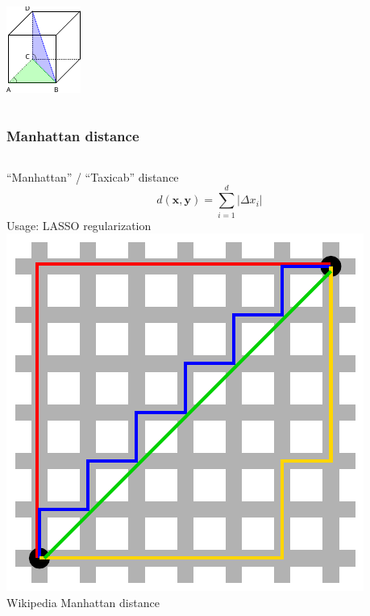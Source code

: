\documentclass[Nike]{tuberlinbeamer}
\newcommand{\x}{\boldsymbol{x}}
\newcommand{\y}{\boldsymbol{y}}
\begin{document}
\begin{frame}[t]
\begin{columns}[T]
      \vskip 2mm
      \includegraphics[width=.7\textwidth]{ndeuclidean.pdf}
  \end{columns}
\end{frame}

\begin{frame}[t]
  \frametitle{Manhattan distance}
  \begin{columns}[T]
      ``Manhattan'' / ``Taxicab'' distance
      \begin{equation*}
        d(\x, \y) = \sum_{i=1}^d |\Delta x_i|
      \end{equation*}
      Usage: LASSO regularization
      \includegraphics[width=\textwidth]{manhattan.pdf}
      \tiny Wikipedia Manhattan distance
  \end{columns}
\end{frame}
\end{document}
